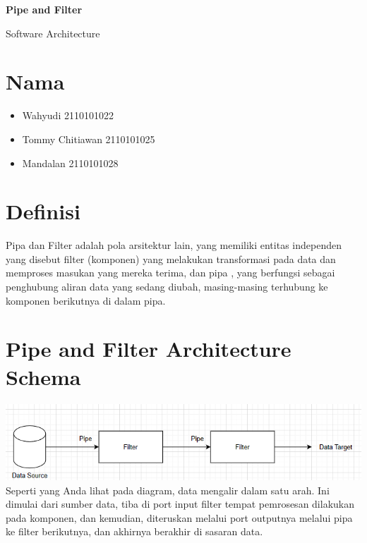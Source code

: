 \documentclass{article}
\begin{document}
	\begin{titlepage}
		\begin{center}
			\textbf{\huge Pipe and Filter}
			
			\vspace{0.5cm}
				
			{\large Software Architecture}
			
			\vspace{2.5cm}
			
			\section*{Nama}
			\begin{varwidth}{\textwidth}
				\begin{itemize}
					\item Wahyudi 2110101022
					\item Tommy Chitiawan 2110101025
					\item Mandalan 2110101028
				\end{itemize}
			\end{varwidth}

			
			
		\end{center}

	\end{titlepage}
	\section{Definisi}
	Pipa dan Filter adalah pola arsitektur lain, yang memiliki entitas independen yang disebut filter (komponen) yang melakukan transformasi pada data dan memproses masukan yang mereka terima, dan pipa , yang berfungsi sebagai penghubung aliran data yang sedang diubah, masing-masing terhubung ke komponen berikutnya di dalam pipa.
	
	\section{Pipe and Filter Architecture Schema
	}
	\includegraphics{Capture.png}
	Seperti yang Anda lihat pada diagram, data mengalir dalam satu arah. Ini dimulai dari sumber data, tiba di port input filter tempat pemrosesan dilakukan pada komponen, dan kemudian, diteruskan melalui port outputnya melalui pipa ke filter berikutnya, dan akhirnya berakhir di sasaran data.
\end{document}
